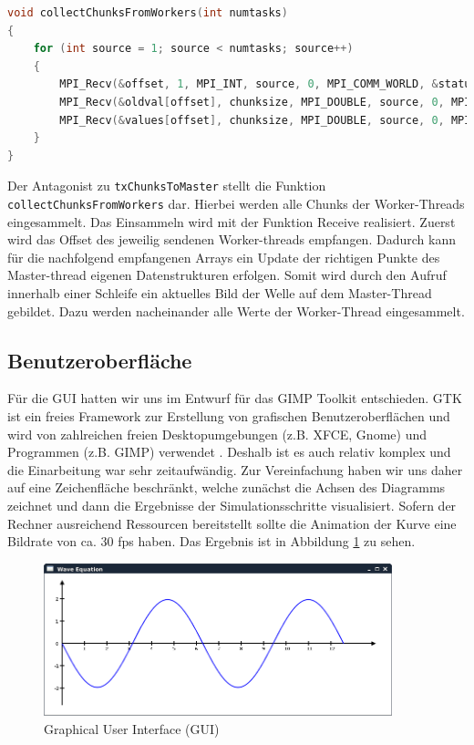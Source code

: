 \begin{lstlisting}[language=C]
void collectChunksFromWorkers(int numtasks)
{
	for (int source = 1; source < numtasks; source++)
	{
		MPI_Recv(&offset, 1, MPI_INT, source, 0, MPI_COMM_WORLD, &status);
		MPI_Recv(&oldval[offset], chunksize, MPI_DOUBLE, source, 0, MPI_COMM_WORLD, 	&status);
		MPI_Recv(&values[offset], chunksize, MPI_DOUBLE, source, 0, MPI_COMM_WORLD, 	&status);
	}
}
\end{lstlisting}

Der Antagonist zu \texttt{txChunksToMaster} stellt die Funktion \texttt{collectChunksFromWorkers} dar. Hierbei werden alle Chunks der Worker-Threads eingesammelt. Das Einsammeln wird mit der Funktion Receive realisiert. Zuerst wird das Offset des jeweilig sendenen Worker-threads empfangen. Dadurch kann für die nachfolgend empfangenen Arrays ein Update der richtigen Punkte des Master-thread eigenen Datenstrukturen erfolgen. Somit wird durch den Aufruf innerhalb einer Schleife ein aktuelles Bild der Welle auf dem Master-Thread gebildet. Dazu werden nacheinander alle Werte der Worker-Thread eingesammelt.


\subsection{Benutzeroberfläche}
Für die GUI hatten wir uns im Entwurf für das GIMP Toolkit entschieden. GTK ist ein freies Framework zur Erstellung von grafischen Benutzeroberflächen und wird von zahlreichen freien Desktopumgebungen (z.B. XFCE, Gnome) und Programmen (z.B. GIMP) verwendet \cite{GTKMain}\cite{GTKSuccess}. Deshalb ist es auch relativ komplex und die Einarbeitung war sehr zeitaufwändig. Zur Vereinfachung haben wir uns daher auf eine Zeichenfläche beschränkt, welche zunächst die Achsen des Diagramms zeichnet und dann die Ergebnisse der Simulationsschritte visualisiert. Sofern der Rechner ausreichend Ressourcen bereitstellt sollte die Animation der Kurve eine Bildrate von ca. 30 fps haben. Das Ergebnis ist in Abbildung \ref{fig:gui} zu sehen.

\begin{figure}[H]
	\centering
	\includegraphics[width=0.9\textwidth]{pictures/gui}
	\caption{Graphical User Interface (GUI)}
	\label{fig:gui}
\end{figure}